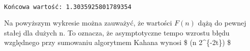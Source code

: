 \documentclass[11pt]{article}
\begin{document}
    \begin{center}
    \end{center}
    { \hspace*{\fill} \\}
    
    \begin{Verbatim}[commandchars=\\\{\}]
Końcowa wartość: 1.3035925801789354

    \end{Verbatim}

    Na powyższym wykresie można zauważyć, że wartości $F(n)$ dążą do pewnej
stałej dla dużych n. To oznacza, że asymptotyczne tempo wzrostu błędu
względnego przy sumowaniu algorytmem Kahana wynosi \$ (n
2\^{}\{-2t\}) \$


    
    
    
    
\end{document}
